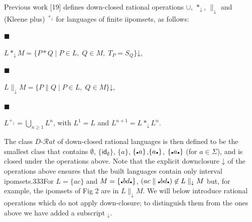 \documentclass[10pt,a4paper]{article}
\begin{document}
 
 
Previous work [19] defines down-closed rational operations $\cup$, $*_{\mathord{\downarrow}}$, $\|_{\mathord{\downarrow}}$ and (Kleene plus) ${}^{+_{\mathord{\downarrow}}}$ for languages of finite iipomsets, as follows:\par
  
\par\noindent  $\blacksquare$ 
 
$L*_{\mathord{\downarrow}}M=\{P*Q\mid P\in L,\;Q\in M,\;T_{P}=S_{Q}\}\mathord{\downarrow}$,\par
 
 
 
\par\noindent  $\blacksquare$ 
 
$L\parallel_{\mathord{\downarrow}}M=\{P\parallel Q\mid P\in L,\;Q\in M\}\mathord{\downarrow}$,\par
 
 
 
\par\noindent  $\blacksquare$ 
 
$L^{+_{\mathord{\downarrow}}}=\bigcup\nolimits_{n\geq 1}L^{n}$, with $L^{1}=L$ and $L^{n+1}=L*_{\mathord{\downarrow}}L^{n}$.\par
 
 
  
The class $D\text{-}\mathcal{R}at$ of down-closed rational languages is then defined to be the smallest class that contains $\emptyset$, ${\{\mathsf{id}_{\emptyset}\}}$, ${\{a\}}$, ${\{\vbox{\hbox{\tiny$\bullet$}}a\}}$,${\{a\vbox{\hbox{\tiny$\bullet$}}\}}$, ${\{\vbox{\hbox{\tiny$\bullet$}}a\vbox{\hbox{\tiny$\bullet$}}\}}$ (for $a\in\Sigma$), and is closed under the operations above. Note that the explicit downclosure $\mathord{\downarrow}$ of the operations above ensures that the built languages contain only interval ipomsets.333For $L={\{ac\}}$ and $M={\{\vbox{\hbox{\tiny$\bullet$}}bd\vbox{\hbox{\tiny$\bullet$}}\}}$, $(ac\parallel\vbox{\hbox{\tiny$\bullet$}}bd\vbox{\hbox{\tiny$\bullet$}})\not\in
L\parallel_{\mathord{\downarrow}}M$ but, for example, the ipomsets of Fig 2 are in $L\parallel_{\mathord{\downarrow}}M$.  We will below introduce rational operations which do not apply down-closure; to distinguish them from the ones above we have added a subscript ${}_{\mathord{\downarrow}}$.\par
 
\end{document}

